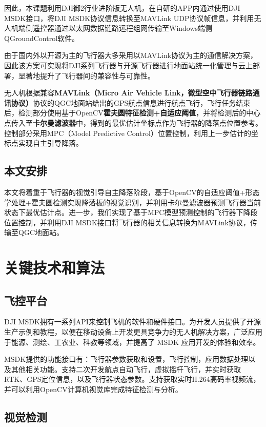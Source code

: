 因此，本课题利用DJI御2行业进阶版无人机，在自研的APP内通过使用DJI MSDK接口，将DJI MSDK协议信息转换至MAVLink UDP协议帧信息，并利用无人机端侧遥控器通过以太网数据链路远程组网传输至Windows端侧QGroundControl软件。

由于国内外以开源为主的飞行器大多采用以MAVLink协议为主的通信解决方案，因此该方案可实现将DJI系列飞行器与开源飞行器进行地面站统一化管理与云上部署，显著地提升了飞行器间的兼容性与可靠性。

无人机根据兼容\textbf{MAVLink（Micro Air Vehicle Link，微型空中飞行器链路通讯协议）}协议的QGC地面站给出的GPS航点信息进行航点飞行，飞行任务结束后，检测部分使用基于OpenCV\textbf{霍夫圆特征检测+自适应阈值}，并将检测后的中心点传入至\textbf{卡尔曼滤波器}中，得到的最优估计坐标点作为飞行器的降落点位置参考。控制部分采用MPC（Model Predictive Control）位置控制，利用上一步估计的坐标点实现自主引导降落。

\section{本文安排}

本文将着重于飞行器的视觉引导自主降落阶段，基于OpenCV的自适应阈值+形态学处理+霍夫圆检测实现降落板的视觉识别，并利用卡尔曼滤波器预测飞行器当前状态下最优估计点。进一步，我们实现了基于MPC模型预测控制的飞行器下降段位置控制，并利用DJI MSDK接口将飞行器的相关信息转换为MAVLink协议，传输至QGC地面站。

\chapter{关键技术和算法}
\section{飞控平台}

DJI MSDK拥有一系列API来控制飞机的软件和硬件接口。为开发人员提供了开源生产示例和教程，以便在移动设备上开发更具竞争力的无人机解决方案，广泛应用于能源、测绘、工农业、科教等领域，并提高了 MSDK 应用开发的体验和效率。

MSDK提供的功能接口有：飞行器参数获取和设置，飞行控制，应用数据处理以及其他相关功能。支持二次开发航点自动飞行，虚拟摇杆飞行，并实时获取RTK、GPS定位信息，以及飞行器状态参数。支持获取实时H.264高码率视频流，并可以利用OpenCV计算机视觉库完成特征检测与分析。

\section{视觉检测}


